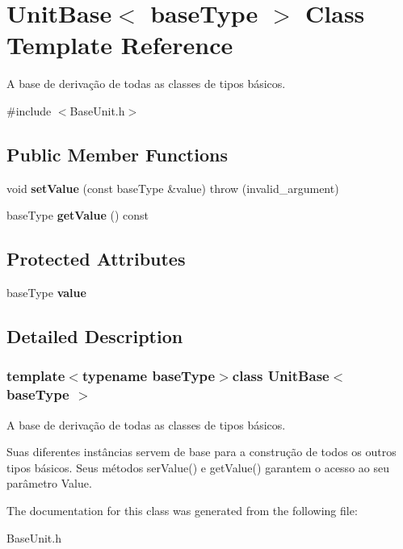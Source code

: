 \hypertarget{classUnitBase}{\section{Unit\-Base$<$ base\-Type $>$ Class Template Reference}
\label{classUnitBase}
}


A base de derivação de todas as classes de tipos básicos.  




{\ttfamily \#include $<$Base\-Unit.\-h$>$}

\subsection*{Public Member Functions}
\begin{DoxyCompactItemize}
\item 
\hypertarget{classUnitBase_af14e2453bc9870f0e04514799585e763}{void {\bfseries set\-Value} (const base\-Type \&value)  throw (invalid\-\_\-argument)}\label{classUnitBase_af14e2453bc9870f0e04514799585e763}

\item 
\hypertarget{classUnitBase_a6b4041c7176acb6c4956e085603449d1}{base\-Type {\bfseries get\-Value} () const }\label{classUnitBase_a6b4041c7176acb6c4956e085603449d1}

\end{DoxyCompactItemize}
\subsection*{Protected Attributes}
\begin{DoxyCompactItemize}
\item 
\hypertarget{classUnitBase_a1c1ad08b45f07a94e5cf71dee734436b}{base\-Type {\bfseries value}}\label{classUnitBase_a1c1ad08b45f07a94e5cf71dee734436b}

\end{DoxyCompactItemize}


\subsection{Detailed Description}
\subsubsection*{template$<$typename base\-Type$>$class Unit\-Base$<$ base\-Type $>$}

A base de derivação de todas as classes de tipos básicos. 

Suas diferentes instâncias servem de base para a construção de todos os outros tipos básicos. Seus métodos ser\-Value() e get\-Value() garantem o acesso ao seu parâmetro Value. 

The documentation for this class was generated from the following file\-:\begin{DoxyCompactItemize}
\item 
Base\-Unit.\-h\end{DoxyCompactItemize}
